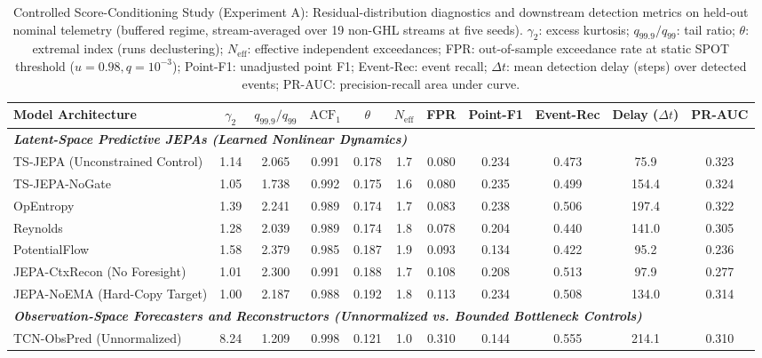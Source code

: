 \begin{table}[t]
\centering
\scriptsize
\caption{Controlled Score-Conditioning Study (Experiment A): Residual-distribution diagnostics and downstream detection metrics on held-out nominal telemetry (buffered regime, stream-averaged over 19 non-GHL streams at five seeds). $\gamma_2$: excess kurtosis; $q_{99.9}/q_{99}$: tail ratio; $\theta$: extremal index (runs declustering); $N_{\mathrm{eff}}$: effective independent exceedances; FPR: out-of-sample exceedance rate at static SPOT threshold ($u=0.98, q=10^{-3}$); Point-F1: unadjusted point F1; Event-Rec: event recall; $\Delta t$: mean detection delay (steps) over detected events; PR-AUC: precision-recall area under curve.}\label{tab:residual_diagnostics}
\scriptsize
\setlength{\tabcolsep}{2.5pt}
\begin{tabular}{@{}lcccccccccc@{}}
\toprule
Model Architecture & $\gamma_2$ & $q_{99.9}/q_{99}$ & $\mathrm{ACF}_1$ & $\theta$ & $N_{\mathrm{eff}}$ & FPR & Point-F1 & Event-Rec & Delay ($\Delta t$) & PR-AUC \\
\midrule
\multicolumn{11}{l}{\textit{\textbf{Latent-Space Predictive JEPAs (Learned Nonlinear Dynamics)}}} \\
TS-JEPA (Unconstrained Control) & 1.14 & 2.065 & 0.991 & 0.178 & 1.7 & 0.080 & 0.234 & 0.473 & 75.9 & 0.323 \\
TS-JEPA-NoGate                 & 1.05 & 1.738 & 0.992 & 0.175 & 1.6 & 0.080 & 0.235 & 0.499 & 154.4 & 0.324 \\
OpEntropy                      & 1.39 & 2.241 & 0.989 & 0.174 & 1.7 & 0.083 & 0.238 & 0.506 & 197.4 & 0.322 \\
Reynolds                       & 1.28 & 2.039 & 0.989 & 0.174 & 1.8 & 0.078 & 0.204 & 0.440 & 141.0 & 0.305 \\
PotentialFlow                  & 1.58 & 2.379 & 0.985 & 0.187 & 1.9 & 0.093 & 0.134 & 0.422 & 95.2 & 0.236 \\
JEPA-CtxRecon (No Foresight)   & 1.01 & 2.300 & 0.991 & 0.188 & 1.7 & 0.108 & 0.208 & 0.513 & 97.9 & 0.277 \\
JEPA-NoEMA (Hard-Copy Target)  & 1.00 & 2.187 & 0.988 & 0.192 & 1.8 & 0.113 & 0.234 & 0.508 & 134.0 & 0.314 \\
\midrule
\multicolumn{11}{l}{\textit{\textbf{Observation-Space Forecasters and Reconstructors (Unnormalized vs. Bounded Bottleneck Controls)}}} \\
TCN-ObsPred (Unnormalized)     & 8.24 & 1.209 & 0.998 & 0.121 & 1.0 & 0.310 & 0.144 & 0.555 & 214.1 & 0.310 \\

\end{tabular}
\end{table}
